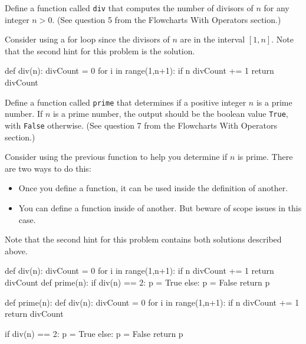 \documentclass{ximera}
\begin{document}
\begin{question}
	Define a function called \verb|div| that computes the number of divisors of $n$ for any integer $n>0$. (See question 5 from the Flowcharts With Operators section.)
	\begin{hint}
	Consider using a for loop since the divisors of $n$ are in the interval $[1,n]$. Note that the second hint for this problem is the solution.
	\end{hint}
	\begin{hint}
\begin{sageCell}
def div(n):
        divCount = 0
        for i in range(1,n+1):
                if n%
                        divCount += 1
        return divCount
\end{sageCell}
	\end{hint}
\end{question}

\begin{question}
	Define a function called \verb|prime| that determines if a positive integer $n$ is a prime number. If $n$ is a prime number, the output should be the boolean value \verb|True|, with \verb|False| otherwise. (See question 7 from the Flowcharts With Operators section.)
	\begin{hint}
	Consider using the previous function to help you determine if $n$ is prime. There are two ways to do this:
	\begin{itemize}
	\item Once you define a function, it can be used inside the definition of another.
	\item You can define a function inside of another. But beware of scope issues in this case.
	\end{itemize}
	Note that the second hint for this problem contains both solutions described above.
	\end{hint}
	\begin{hint}
\begin{sageCell}
def div(n):
        divCount = 0
        for i in range(1,n+1):
                if n%
                        divCount += 1
        return divCount
def prime(n):
        if div(n) == 2:
                p = True
        else:
                p = False
        return p
\end{sageCell}
\begin{sageCell}
def prime(n):
        def div(n):
                divCount = 0
                for i in range(1,n+1):
                        if n%
                                divCount += 1
                return divCount

        if div(n) == 2:
                p = True
        else:
                p = False
        return p
\end{sageCell}
	\end{hint}
\end{question}
\end{document}
